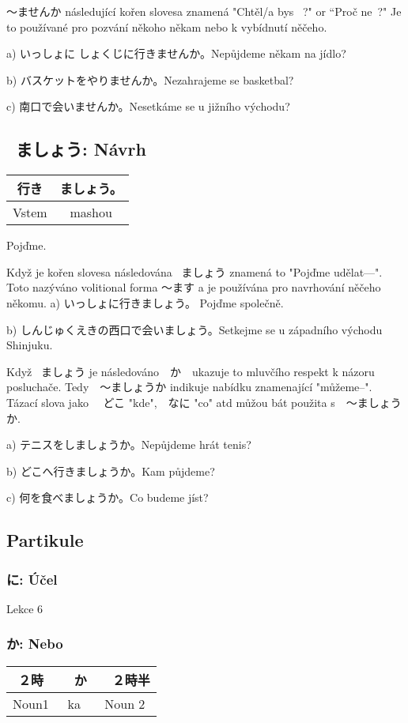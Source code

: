 〜ませんか následující kořen slovesa znamená "Chtěl/a bys 
~?" or “Proč ne~?" Je to používané pro pozvání někoho někam nebo k vybídnutí něčeho.


a) いっしょに しょくじに行きませんか。Nepůjdeme někam na jídlo?

b) バスケットをやりませんか。Nezahrajeme se basketbal?

c) 南口で会いませんか。Nesetkáme se u jižního východu?


\subsection{ ~ましょう: Návrh}

\begin{center}
\begin{tabular}{||c|c||}
\hline
行き&ましょう。\\
\hline
Vstem&mashou\\
\hline
\end{tabular}
\end{center}
Pojďme.


Když je kořen slovesa následována ~ましょう znamená to "Pojďme udělat---". Toto nazýváno volitional forma 〜ます a je používána pro navrhování něčeho někomu.
a) いっしょに行きましょう。 Pojďme společně.

b) しんじゅくえきの西口で会いましょう。Setkejme se u západního východu Shinjuku.


Když ~ましょう je následováno　か　ukazuje to mluvčího respekt k názoru posluchače. Tedy　〜ましょうか indikuje nabídku znamenající "můžeme--". Tázací slova jako 　どこ "kde",　なに "co" atd můžou bát použita s　〜ましょうか.

a) テニスをしましょうか。Nepůjdeme hrát tenis?

b) どこへ行きましょうか。Kam půjdeme?

c) 何を食べましょうか。Co budeme jíst?

\subsection{Partikule}
\subsubsection{に: Účel}
Lekce 6

\subsubsection{か: Nebo}
\begin{center}
\begin{tabular}{|c|c|c|}
\hline
２時&　か&　２時半\\
\hline
Noun1&ka&Noun 2\\
\hline
\end{tabular}
\end{center}

